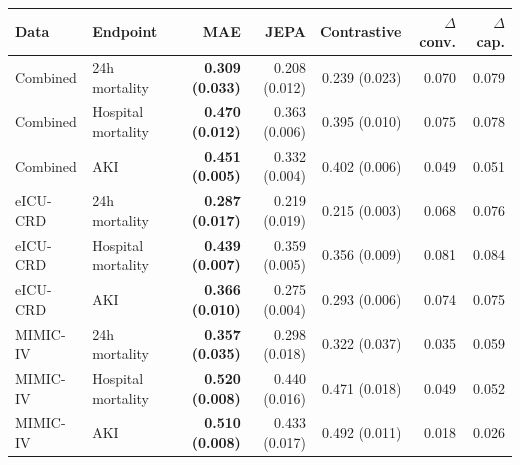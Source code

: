 \begin{tabular}{llrrrrr}
\toprule
Data & Endpoint & MAE & JEPA & Contrastive & $\Delta$ conv. & $\Delta$ cap. \\
\midrule
Combined & 24h mortality & \textbf{0.309 (0.033)} & 0.208 (0.012) & 0.239 (0.023) & 0.070 & 0.079 \\
Combined & Hospital mortality & \textbf{0.470 (0.012)} & 0.363 (0.006) & 0.395 (0.010) & 0.075 & 0.078 \\
Combined & AKI & \textbf{0.451 (0.005)} & 0.332 (0.004) & 0.402 (0.006) & 0.049 & 0.051 \\
eICU-CRD & 24h mortality & \textbf{0.287 (0.017)} & 0.219 (0.019) & 0.215 (0.003) & 0.068 & 0.076 \\
eICU-CRD & Hospital mortality & \textbf{0.439 (0.007)} & 0.359 (0.005) & 0.356 (0.009) & 0.081 & 0.084 \\
eICU-CRD & AKI & \textbf{0.366 (0.010)} & 0.275 (0.004) & 0.293 (0.006) & 0.074 & 0.075 \\
MIMIC-IV & 24h mortality & \textbf{0.357 (0.035)} & 0.298 (0.018) & 0.322 (0.037) & 0.035 & 0.059 \\
MIMIC-IV & Hospital mortality & \textbf{0.520 (0.008)} & 0.440 (0.016) & 0.471 (0.018) & 0.049 & 0.052 \\
MIMIC-IV & AKI & \textbf{0.510 (0.008)} & 0.433 (0.017) & 0.492 (0.011) & 0.018 & 0.026 \\
\bottomrule
\end{tabular}
